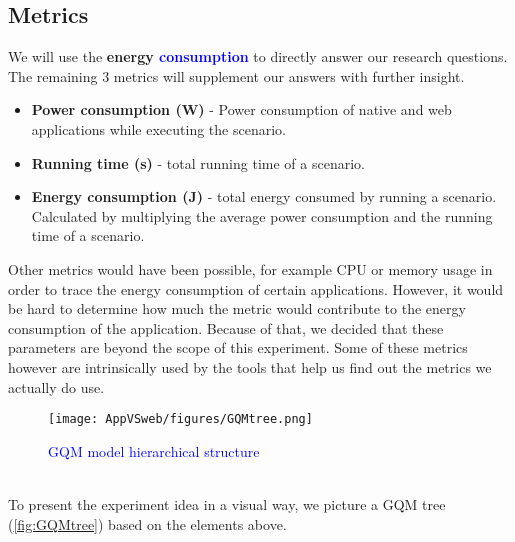 \subsection{Metrics}
We will use the  \textbf{energy \textcolor{blue}{consumption}} to directly answer our research questions. The remaining 3 metrics will supplement our answers with further insight. 
\begin{itemize}
    \item \textbf{Power consumption (W)} - Power consumption of native and web applications while executing the scenario. 	       %
    \item \textbf{Running time (s)} - total running time of a scenario.
    \item \textbf{Energy consumption (J)} - total energy consumed by running a scenario. Calculated by multiplying the average power consumption and the running time of a scenario.
\end{itemize}
Other metrics would have been possible, for example CPU or memory usage in order to trace the energy consumption of certain applications. However, it would be hard to determine how much the metric would contribute to the energy consumption of the application. Because of that, we decided that these parameters are beyond the scope of this experiment. Some of these metrics however are intrinsically used by the tools that help us find out the metrics we actually do use.
\begin{figure*}[!ht]
\texttt{[image: AppVSweb/figures/GQMtree.png]}
\caption{\textcolor{blue}{GQM model hierarchical structure}}
\label{fig:GQMtree}

\end{figure*}
\\To present the experiment idea in a visual way, we picture a GQM tree (\autoref{fig:GQMtree}) based on the elements above.
